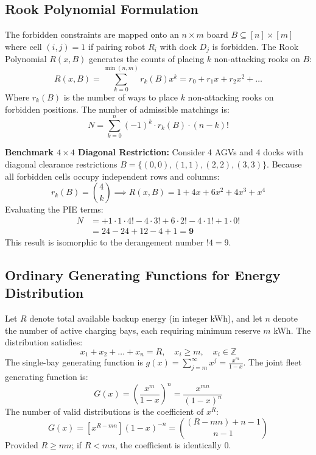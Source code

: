 \documentclass[conference]{IEEEtran}
\begin{document}
\subsection{Rook Polynomial Formulation}
The forbidden constraints are mapped onto an $n \times m$ board $B \subseteq [n] \times [m]$ where cell $(i, j) = 1$ if pairing robot $R_i$ with dock $D_j$ is forbidden. The Rook Polynomial $R(x, B)$ generates the counts of placing $k$ non-attacking rooks on $B$:
\begin{equation}
R(x, B) = \sum_{k=0}^{\min(n, m)} r_k(B) x^k = r_0 + r_1 x + r_2 x^2 + \dots
\end{equation}
Where $r_k(B)$ is the number of ways to place $k$ non-attacking rooks on forbidden positions. The number of admissible matchings is:
\begin{equation}
N = \sum_{k=0}^n (-1)^k \cdot r_k(B) \cdot (n - k)!
\end{equation}

\textbf{Benchmark $4 \times 4$ Diagonal Restriction:}
Consider 4 AGVs and 4 docks with diagonal clearance restrictions $B = \{(0,0), (1,1), (2,2), (3,3)\}$. Because all forbidden cells occupy independent rows and columns:
\begin{equation}
r_k(B) = \binom{4}{k} \implies R(x, B) = 1 + 4x + 6x^2 + 4x^3 + x^4
\end{equation}
Evaluating the PIE terms:
\begin{align}
N &= +1 \cdot 1 \cdot 4! - 4 \cdot 3! + 6 \cdot 2! - 4 \cdot 1! + 1 \cdot 0! \nonumber\\
  &= 24 - 24 + 12 - 4 + 1 = \mathbf{9}
\end{align}
This result is isomorphic to the derangement number $!4 = 9$.

\subsection{Ordinary Generating Functions for Energy Distribution}
Let $R$ denote total available backup energy (in integer kWh), and let $n$ denote the number of active charging bays, each requiring minimum reserve $m$ kWh. The distribution satisfies:
\begin{equation}
x_1 + x_2 + \dots + x_n = R, \quad x_i \ge m, \quad x_i \in \mathbb{Z}
\end{equation}
The single-bay generating function is $g(x) = \sum_{j=m}^\infty x^j = \frac{x^m}{1 - x}$. The joint fleet generating function is:
\begin{equation}
G(x) = \left(\frac{x^m}{1 - x}\right)^n = \frac{x^{mn}}{(1 - x)^n}
\end{equation}
The number of valid distributions is the coefficient of $x^R$:
\begin{equation}
[x^R] G(x) = [x^{R - mn}] (1 - x)^{-n} = \binom{(R - mn) + n - 1}{n - 1}
\end{equation}
Provided $R \ge mn$; if $R < mn$, the coefficient is identically $0$.
\end{document}
